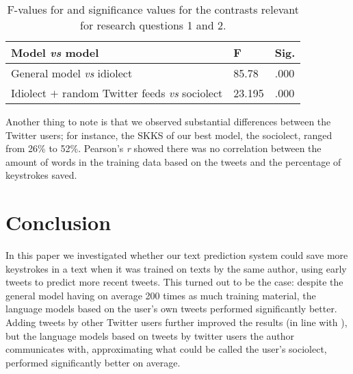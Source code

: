 \documentclass[11pt]{article}
\begin{document}
\begin{table}[htb]
\begin{center}
\begin{tabular}{p{4.5cm}|ll} 
Model \emph{vs} model & F & Sig.\\
\hline 
General model \emph{vs} idiolect & 85.78 & .000\\ 
Idiolect $+$ random Twitter feeds \emph{vs} sociolect & 23.195 & .000\\
\end{tabular}
\caption{F-values for and significance values for the contrasts relevant for research questions 1 and 2.}
\label{stat}
\end{center}
\end{table}

Another thing to note is that we observed substantial differences between the Twitter users; for instance, the SKKS of our best model, the sociolect, ranged from 26\% to 52\%. Pearson's \emph{r} showed there was no correlation between the amount of words in the training data based on the tweets and the percentage of keystrokes saved.

\section{Conclusion}
In this paper we investigated whether our text prediction system could save more keystrokes in a text when it was trained on texts by the same author, using early tweets to predict more recent tweets. This turned out to be the case: despite the general model having on average 200 times as much training material, the language models based on the user's own tweets performed significantly better. Adding tweets by other Twitter users further improved the results (in line with \cite{verberne12}), but the language models based on tweets by twitter users the author communicates with, approximating what could be called the user's sociolect, performed significantly better on average.



\end{document}
